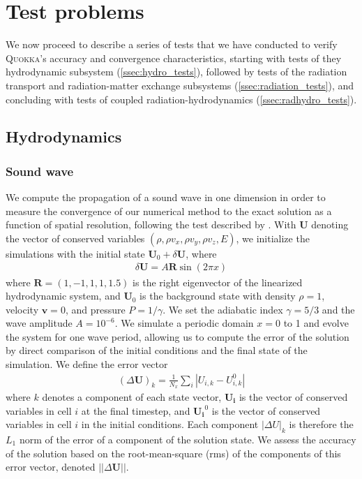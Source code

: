 \documentclass[fleqn,usenatbib]{mnras}
\newcommand{\vc}[1]{{\mathbf{#1}}}
\newcommand{\quokka}{\textsc{Quokka}}
\begin{document}
\section{Test problems}
\label{section:tests}

We now proceed to describe a series of tests that we have conducted to verify \quokka's accuracy and convergence characteristics, starting with tests of they hydrodynamic subsystem (\autoref{ssec:hydro_tests}), followed by tests of the radiation transport and radiation-matter exchange subsystems (\autoref{ssec:radiation_tests}), and concluding with tests of coupled radiation-hydrodynamics (\autoref{ssec:radhydro_tests}).

\subsection{Hydrodynamics}
\label{ssec:hydro_tests}

\subsubsection{Sound wave}
We compute the propagation of a sound wave in one dimension in order to measure the convergence of our numerical method to the exact solution as a function of spatial resolution, following the test described by \cite{Stone_2008}. With $\vc{U}$ denoting the vector of conserved variables $(\rho, \rho v_x, \rho v_y, \rho v_z, E)$, we initialize the simulations with the initial state $\vc{U}_0 + \delta \vc{U}$, where
\begin{align}
\delta \vc{U} = A \vc{R} \sin(2\pi x)
\end{align}
where $\vc{R} = (1,-1,1,1,1.5)$ is the right eigenvector of the linearized hydrodynamic system, and $\vc{U}_0$ is the background state with density $\rho = 1$, velocity $\vc{v} = 0$, and pressure $P = 1/\gamma$. We set the adiabatic index $\gamma = 5/3$ and the wave amplitude $A = 10^{-6}$. We simulate a periodic domain $x= 0$ to 1 and evolve the system for one wave period, allowing us to compute the error of the solution by direct comparison of the initial conditions and the final state of the simulation. We define the error vector
\begin{align}
(\Delta \vc{U})_{k} = \frac{1}{N_x} \sum_{i} \left| U_{i,k} - U_{i,k}^{0} \right|
\label{eq:convergence_error}
\end{align}
where $k$ denotes a component of each state vector, $\vc{U_i}$ is the vector of conserved variables in cell $i$ at the final timestep, and $\vc{U_i}^{0}$ is the vector of conserved variables in cell $i$ in the initial conditions. Each component $|\Delta U|_k$ is therefore the $L_1$ norm of the error of a component of the solution state.  We assess the accuracy of the solution based on the root-mean-square (rms) of the components of this error vector, denoted $||\Delta \vc{U}||$.
\end{document}
